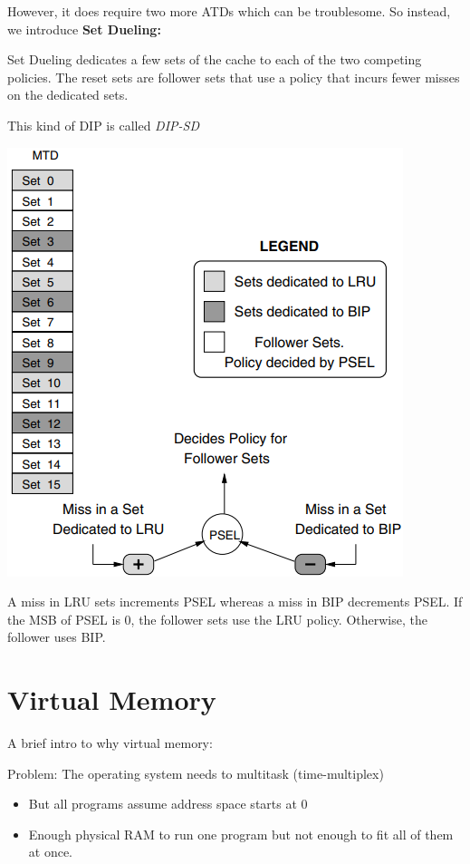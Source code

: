 \documentclass[letterpaper,12pt]{article}
\begin{document}
\begin{enumerate}
          However, it does require two more ATDs which can be troublesome. So instead, we introduce \textbf{Set Dueling:}

          Set Dueling dedicates a few sets of the cache to each of the two competing policies. The reset sets are follower sets that use a policy that incurs fewer misses on the dedicated sets.

          This kind of DIP is called \textit{DIP-SD}

          \includegraphics*[scale=0.7]{./Image/DIP-SD.png}

          A miss in LRU sets increments PSEL whereas a miss in BIP decrements PSEL. If the MSB of PSEL is 0, the follower sets use the LRU policy. Otherwise, the follower uses BIP.
\end{enumerate}

\section{Virtual Memory}

A brief intro to why virtual memory:

Problem: The operating system needs to multitask (time-multiplex)
\begin{itemize}
    \item But all programs assume address space starts at 0
    \item Enough physical RAM to run one program but not enough to fit all of them at once.
\end{itemize}
\end{document}
